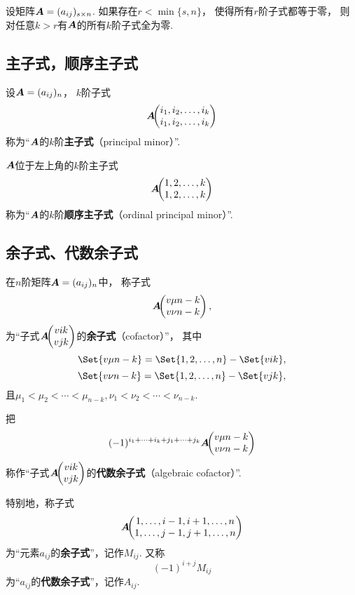 \begin{property}
设矩阵\(\boldsymbol{A} = (a_{ij})_{s \times n}\).
如果存在\(r < \min\{s,n\}\)，%
使得所有\(r\)阶子式都等于零，%
则对任意\(k > r\)有\(\boldsymbol{A}\)的所有\(k\)阶子式全为零.
\end{property}

\subsection{主子式，顺序主子式}
\begin{definition}
设\(\boldsymbol{A}=(a_{ij})_n\)，%
\(k\)阶子式\[
	\boldsymbol{A}\kern-3.8pt\begin{pmatrix}
		i_1,i_2,\dotsc,i_k \\
		i_1,i_2,\dotsc,i_k
	\end{pmatrix}
\]
称为“\(\boldsymbol{A}\)的\(k\)阶\textbf{主子式}（principal minor）”.

\(\boldsymbol{A}\)位于左上角的\(k\)阶主子式\[
	\boldsymbol{A}\kern-3.8pt\begin{pmatrix}
		1,2,\dotsc,k \\
		1,2,\dotsc,k
	\end{pmatrix}
\]称为“\(\boldsymbol{A}\)的\(k\)阶\textbf{顺序主子式}（ordinal principal minor）”.
\end{definition}

\subsection{余子式、代数余子式}
\begin{definition}
在\(n\)阶矩阵\(\boldsymbol{A}=(a_{ij})_n\)中，
称子式\[
	\boldsymbol{A}\kern-3.8pt\begin{pmatrix}
		v{\mu}{n-k} \\
		v{\nu}{n-k}
	\end{pmatrix},
\]为“子式\(\boldsymbol{A}\kern-3.8pt\begin{pmatrix}
	v{i}{k} \\
	v{j}{k}
\end{pmatrix}\)的\textbf{余子式}（cofactor）”，
其中\[
	\Set{ \v{\mu}{n-k} } = \Set{ 1,2,\dotsc,n } - \Set{ \v{i}{k} },
\]\[
	\Set{ \v{\nu}{n-k} } = \Set{ 1,2,\dotsc,n } - \Set{ \v{j}{k} },
\]
且\(\mu_1<\mu_2<\dotsb<\mu_{n-k},
\nu_1<\nu_2<\dotsb<\nu_{n-k}\).

把\[
	(-1)^{i_1+\dotsb+i_k+j_1+\dotsb+j_k}
	\boldsymbol{A}\kern-3.8pt\begin{pmatrix}
		v{\mu}{n-k} \\
		v{\nu}{n-k}
	\end{pmatrix}
\]称作“子式\(\boldsymbol{A}\kern-3.8pt\begin{pmatrix}
	v{i}{k} \\
	v{j}{k}
\end{pmatrix}\)的\textbf{代数余子式}（algebraic cofactor）”.

特别地，称子式\[
	\boldsymbol{A}\kern-3.8pt\begin{pmatrix}
		1,\dotsc,i-1,i+1,\dotsc,n \\
		1,\dotsc,j-1,j+1,\dotsc,n
	\end{pmatrix}
\]为“元素\(a_{ij}\)的\textbf{余子式}”，记作\(M_{ij}\).
又称\[
(-1)^{i+j} M_{ij}
\]为“\(a_{ij}\)的\textbf{代数余子式}”，记作\(A_{ij}\).
\end{definition}

